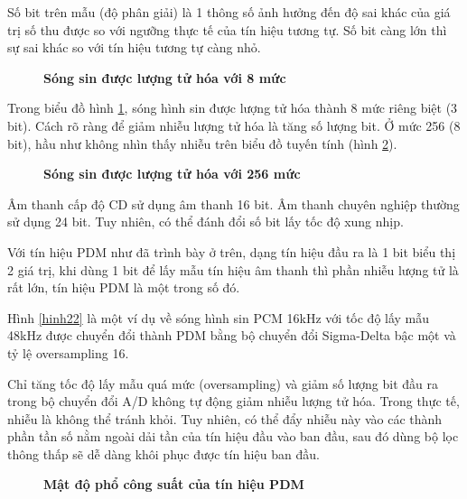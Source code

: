 Số bit trên mẫu (độ phân giải) là 1 thông số ảnh hưởng đến độ sai khác của giá trị số thu được so với ngưỡng thực tế của tín hiệu tương tự. Số bit càng lớn thì sự sai khác so với tín hiệu tương tự càng nhỏ.

\begin{figure}[!ht]
    \centering
    
    \caption[Sóng sin được lượng tử hóa với 8 mức]{\bfseries \fontsize{12pt}{0pt}\selectfont Sóng sin được lượng tử hóa với 8 mức}
    \label{h_quantization_noise_8}
\end{figure}
Trong biểu đồ hình \ref{h_quantization_noise_8}, sóng hình sin được lượng tử hóa thành 8 mức riêng biệt (3 bit). Cách rõ ràng để giảm nhiễu lượng tử hóa là tăng số lượng bit. Ở mức 256 (8 bit), hầu như không nhìn thấy nhiễu trên biểu đồ tuyến tính (hình \ref{h_quantization_noise_256}).

\begin{figure}[!ht]
    \centering
    
    \caption[Sóng sin được lượng tử hóa với 256 mức]{\bfseries \fontsize{12pt}{0pt}\selectfont Sóng sin được lượng tử hóa với 256 mức}
    \label{h_quantization_noise_256}
\end{figure}

Âm thanh cấp độ CD sử dụng âm thanh 16 bit. Âm thanh chuyên nghiệp thường sử dụng 24 bit. Tuy nhiên, có thể đánh đổi số bit lấy tốc độ xung nhịp.

Với tín hiệu PDM như đã trình bày ở trên, dạng tín hiệu đầu ra là 1 bit biểu thị 2 giá trị, khi dùng 1 bit để lấy mẫu tín hiệu âm thanh thì phần nhiễu lượng tử là rất lớn, tín hiệu PDM là một trong số đó.

Hình \ref{hinh22} là một ví dụ về sóng hình sin PCM 16kHz với tốc độ lấy mẫu 48kHz được chuyển đổi thành PDM bằng bộ chuyển đổi Sigma-Delta bậc một và tỷ lệ oversampling 16.

Chỉ tăng tốc độ lấy mẫu quá mức (oversampling) và giảm số lượng bit đầu ra trong bộ chuyển đổi A/D không tự động giảm nhiễu lượng tử hóa. Trong thực tế, nhiễu là không thể tránh khỏi. Tuy nhiên, có thể đẩy nhiễu này vào các thành phần tần số nằm ngoài dải tần của tín hiệu đầu vào ban đầu, sau đó dùng bộ lọc thông thấp sẽ dễ dàng khôi phục được tín hiệu ban đầu.
\begin{figure}[!ht]
    \centering
    
    \caption[Mật độ phổ công suất của tín hiệu PDM]{\bfseries \fontsize{12pt}{0pt}\selectfont Mật độ phổ công suất của tín hiệu PDM}
    \label{sinewave_pdm_psd}
\end{figure}

